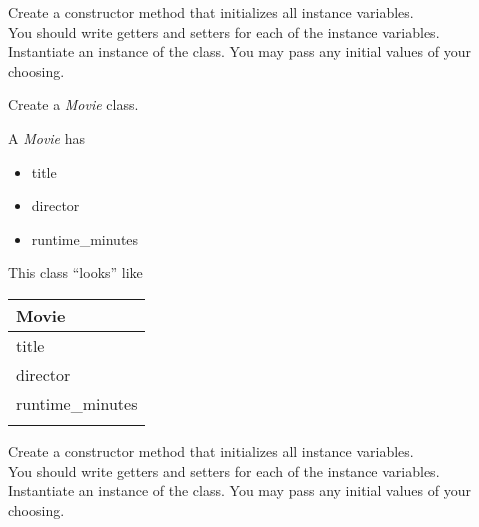 	\vspace*{2ex}
	Create a constructor method that initializes all instance variables.\\
	You should write getters and setters for each of the instance variables.\\
	Instantiate an instance of the class. You may pass any initial values of your choosing.



	\item Create a \textit{Movie} class.\\
	\begin{minipage}{.6\textwidth}		
		A \textit{Movie} has
		\begin{itemize}
			\item title 
			\item director
			\item runtime\_minutes	
		\end{itemize}
	\end{minipage}
	\begin{minipage}{.4\textwidth}
		This class ``looks'' like 
				
		\vspace*{1em}
		\begin{tabular}{|l|}
			\hline Movie\\ \hline
			title\\ director\\ runtime\_minutes\\ \hline
			\\  \hline
		\end{tabular}
	\end{minipage}

	\vspace*{2ex}
	Create a constructor method that initializes all instance variables.\\
	You should write getters and setters for each of the instance variables.\\
	Instantiate an instance of the class. You may pass any initial values of your choosing.



